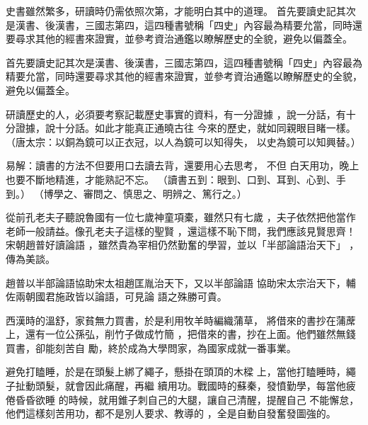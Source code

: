 \documentclass[avery5371,grid]{flashcards}
\begin{document}
{史書雖然繁多，研讀時仍需依照次第，才能明白其中的道理。
首先要讀史記其次是漢書、後漢書，三國志第四，這四種書號稱「四史」內容最為精要允當，同時還要尋求其他的經書來證實，並參考資治通鑑以瞭解歷史的全貌，避免以偏蓋全。} %
{} %

{首先要讀史記其次是漢書、後漢書，三國志第四，這四種書號稱「四史」內容最為精要允當，同時還要尋求其他的經書來證實，並參考資治通鑑以瞭解歷史的全貌，避免以偏蓋全。} %
{} %

{研讀歷史的人，必須要考察記載歷史事實的資料，有一分證據
，說一分話，有十分證據，說十分話。如此才能真正通曉古往
今來的歷史，就如同親眼目睹一樣。} %
{（唐太宗：以銅為鏡可以正衣冠，以人為鏡可以知得失，
以史為鏡可以知興替。）} %






{易解：讀書的方法不但要用口去讀去背，還要用心去思考，
不但 白天用功，晚上也要不斷地精進，才能熟記不忘。} %
{（讀書五到：眼到、口到、耳到、心到、手到。）
（博學之、審問之、慎思之、明辨之、篤行之。）} %

{從前孔老夫子聽說魯國有一位七歲神童項橐，雖然只有七歲
，夫子依然把他當作老師一般請益。像孔老夫子這樣的聖賢
，還這樣不恥下問，我們應該見賢思齊！宋朝趙普好讀論語
，雖然貴為宰相仍然勤奮的學習，並以「半部論語治天下」
，傳為美談。} %
{} %

{趙普以半部論語協助宋太祖趙匡胤治天下，又以半部論語
協助宋太宗治天下，輔佐兩朝國君施政皆以論語，可見論
語之殊勝可貴。} %
{} %

{西漢時的溫舒，家貧無力買書，於是利用牧羊時編織蒲草，
將借來的書抄在蒲蓆上，還有一位公孫弘，削竹子做成竹簡
，把借來的書，抄在上面。他們雖然無錢買書，卻能刻苦自
勵，終於成為大學問家，為國家成就一番事業。} %
{} %

{避免打瞌睡，於是在頭髮上綁了繩子，懸掛在頭頂的木樑
上，當他打瞌睡時，繩子扯動頭髮，就會因此痛醒，再繼
續用功。戰國時的蘇秦，發憤勤學，每當他疲倦昏昏欲睡
的時候，就用錐子刺自己的大腿，讓自己清醒，提醒自己
不能懈怠，他們這樣刻苦用功，都不是別人要求、教導的
，全是自動自發奮發圖強的。} %
{} %
\end{document}
